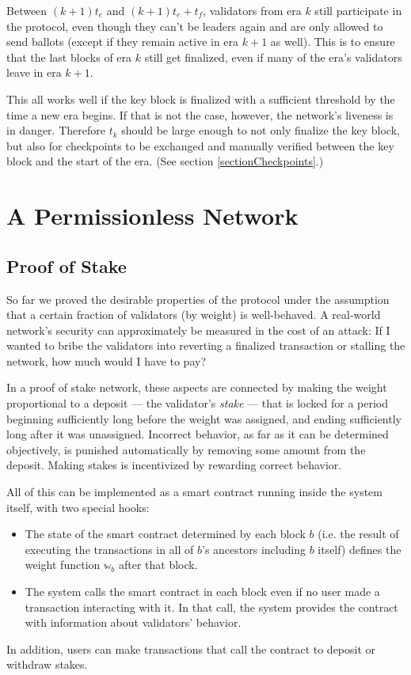 \documentclass[12pt]{article}
\begin{document}
Between $(k + 1) t_e$ and $(k + 1) t_e + t_f$, validators from era $k$ still participate in the protocol, even though they can't be leaders again and are only allowed to send ballots (except if they remain active in era $k + 1$ as well). This is to ensure that the last blocks of era $k$ still get finalized, even if many of the era's validators leave in era $k + 1$.

This all works well if the key block is finalized with a sufficient threshold by the time a new era begins. If that is not the case, however, the network's liveness is in danger. Therefore $t_k$ should be large enough to not only finalize the key block, but also for checkpoints to be exchanged and manually verified between the key block and the start of the era. (See section \ref{sectionCheckpoints}.)


\section{A Permissionless Network}
\label{sectionPermissionless}


\subsection{Proof of Stake}
\label{sectionPos}

So far we proved the desirable properties of the protocol under the assumption that a certain fraction of validators (by weight) is well-behaved. A real-world network's security can approximately be measured in the cost of an attack: If I wanted to bribe the validators into reverting a finalized transaction or stalling the network, how much would I have to pay?

In a proof of stake network, these aspects are connected by making the weight proportional to a deposit --- the validator's \emph{stake} --- that is locked for a period beginning sufficiently long before the weight was assigned, and ending sufficiently long after it was unassigned. Incorrect behavior, as far as it can be determined objectively, is punished automatically by removing some amount from the deposit. Making stakes is incentivized by rewarding correct behavior.

All of this can be implemented as a smart contract running inside the system itself, with two special hooks:
\begin{itemize}
  \item The state of the smart contract determined by each block $b$ (i.e. the result of executing the transactions in all of $b$'s ancestors including $b$ itself) defines the weight function $\mathbb{w}_b$ after that block.
  \item The system calls the smart contract in each block even if no user made a transaction interacting with it. In that call, the system provides the contract with information about validators' behavior.
\end{itemize}
In addition, users can make transactions that call the contract to deposit or withdraw stakes.
\end{document}
